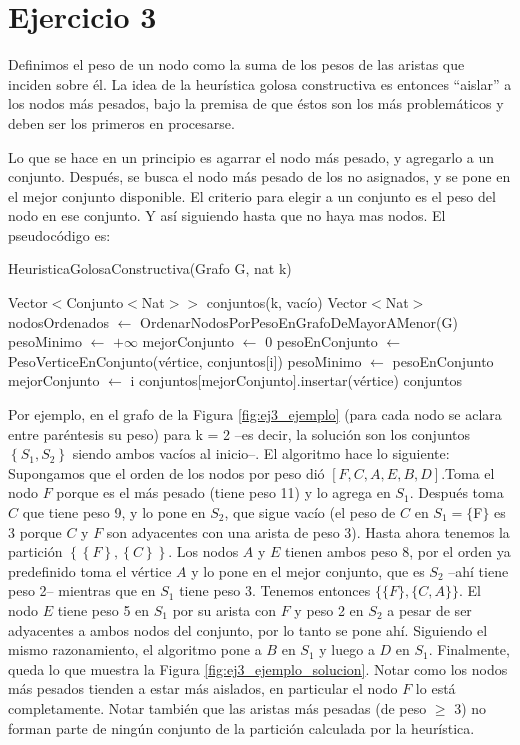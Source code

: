 \section{Ejercicio 3}

Definimos el peso de un nodo como la suma de los pesos de las aristas que inciden sobre él. La idea de la heurística golosa constructiva es entonces ``aislar'' a los nodos más pesados, bajo la premisa de que éstos son los más problemáticos y deben ser los primeros en procesarse.

Lo que se hace en un principio es agarrar el nodo más pesado, y agregarlo a un conjunto. Después, se busca el nodo más pesado de los no asignados, y se pone en el mejor conjunto disponible. El criterio para elegir a un conjunto es el peso del nodo en ese conjunto. Y así siguiendo hasta que no haya mas nodos. El pseudocódigo es:
\begin{algorithm}[H]
\begin{algorithmic}[1]
\caption{HeuristicaGolosaConstructiva(Grafo G, nat k)}
\STATE Vector$<$Conjunto$<$Nat$>>$ conjuntos(k, vacío)
\STATE Vector$<$Nat$>$ nodosOrdenados $\leftarrow$ OrdenarNodosPorPesoEnGrafoDeMayorAMenor(G)
    \STATE pesoMinimo $\leftarrow$ $+ \infty$
    \STATE mejorConjunto $\leftarrow$ 0
        \STATE pesoEnConjunto $\leftarrow$ PesoVerticeEnConjunto(vértice, conjuntos$[$i$]$)
            \STATE pesoMinimo $\leftarrow$ pesoEnConjunto
            \STATE mejorConjunto $\leftarrow$ i
        \ENDIF
    \ENDFOR
    \STATE conjuntos$[$mejorConjunto$]$.insertar(vértice)
\ENDFOR
\RETURN conjuntos
\end{algorithmic}
\end{algorithm}

Por ejemplo, en el grafo de la Figura \ref{fig:ej3_ejemplo} (para cada nodo se aclara entre paréntesis su peso) para k = 2 --es decir, la solución son los conjuntos $\left\{S_1, S_2\right\}$ siendo ambos vacíos al inicio--. El algoritmo hace lo siguiente: Supongamos que el orden de los nodos por peso dió $[F, C, A, E, B, D]$.Toma el nodo $F$ porque es el más pesado (tiene peso 11) y lo agrega en $S_1$. Después toma $C$ que tiene peso 9, y lo pone en $S_2$, que sigue vacío (el peso de $C$ en $S_1 = \{$F$\}$ es 3 porque $C$ y $F$ son adyacentes con una arista de peso 3). Hasta ahora tenemos la partición $\left\{ \left\{F\right\}, \left\{C\right\} \right\}$. Los nodos $A$ y $E$ tienen ambos peso 8, por el orden ya predefinido toma el vértice $A$ y lo pone en el mejor conjunto, que es $S_2$ --ahí tiene peso 2-- mientras que en $S_1$ tiene peso 3. Tenemos entonces $\{ \{F\}, \{C, A\} \}$. El nodo $E$ tiene peso 5 en $S_1$ por su arista con $F$ y peso 2 en $S_2$ a pesar de ser adyacentes a ambos nodos del conjunto, por lo tanto se pone ahí. Siguiendo el mismo razonamiento, el algoritmo pone a $B$ en $S_1$ y luego a $D$ en $S_1$. Finalmente, queda lo que muestra la Figura \ref{fig:ej3_ejemplo_solucion}. Notar como los nodos más pesados tienden a estar más aislados, en particular el nodo $F$ lo está completamente. Notar también que las aristas más pesadas (de peso $\geq$ 3) no forman parte de ningún conjunto de la partición calculada por la heurística.

